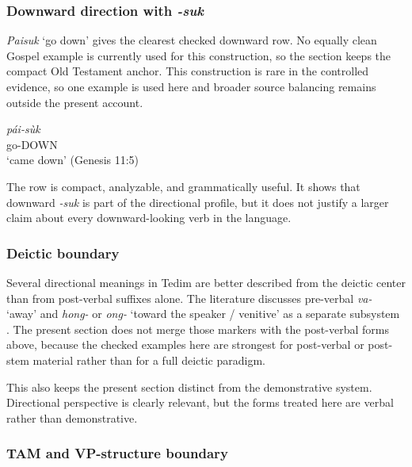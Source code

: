 \documentclass[
  11pt,
  a4paper,
]{article}
\newcommand{\tdim}[1]{\textit{#1}}
\newcommand{\tdimword}[1]{\textit{#1}}
\renewcommand{\textsc}[1]{{\footnotesize\MakeUppercase{#1}}}
\newcommand{\glossquote}[1]{`#1'}
\begin{document}
\subsubsection{\texorpdfstring{Downward direction with
\tdim{-suk}}{Downward direction with }}\label{downward-direction-with}

\tdim{Paisuk} \glossquote{go down} gives the clearest checked downward
row. No equally clean Gospel example is currently used for this
construction, so the section keeps the compact Old Testament anchor.
This construction is rare in the controlled evidence, so one example is
used here and broader source balancing remains outside the present
account.

\begin{exe}
\ex \label{ex:dir-paisuk}
\gll \tdimword{pái-sùk} \\
     go-\textsc{down} \\
\glt \glossquote{came down} (Genesis 11:5)
\end{exe}

The row is compact, analyzable, and grammatically useful. It shows that
downward \tdim{-suk} is part of the directional profile, but it does not
justify a larger claim about every downward-looking verb in the
language.

\subsubsection{Deictic boundary}\label{deictic-boundary}

Several directional meanings in Tedim are better described from the
deictic center than from post-verbal suffixes alone. The literature
discusses pre-verbal \tdim{va-} \glossquote{away} and \tdim{hong-} or
\tdim{ong-} \glossquote{toward the speaker / venitive} as a separate
subsystem
\citep{henderson1965, zamngaihcing2017, otsuka_kurabe_directional_affixes}.
The present section does not merge those markers with the post-verbal
forms above, because the checked examples here are strongest for
post-verbal or post-stem material rather than for a full deictic
paradigm.

This also keeps the present section distinct from the demonstrative
system. Directional perspective is clearly relevant, but the forms
treated here are verbal rather than demonstrative.

\subsubsection{TAM and VP-structure
boundary}\label{tam-and-vp-structure-boundary}
\end{document}
